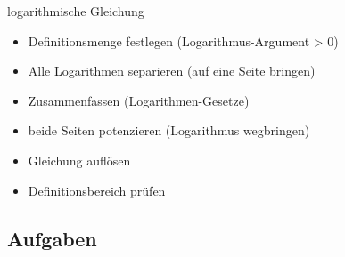 \begin{rezept}{logarithmische Gleichung}{}
  \begin{itemize}
  \item Definitionsmenge festlegen (Logarithmus-Argument > 0)
  \item Alle Logarithmen separieren (auf eine Seite bringen)
  \item Zusammenfassen (Logarithmen-Gesetze)
  \item beide Seiten potenzieren (Logarithmus wegbringen)
  \item Gleichung auflösen
  \item Definitionsbereich prüfen
 \end{itemize}
\end{rezept}

\subsection*{Aufgaben}
